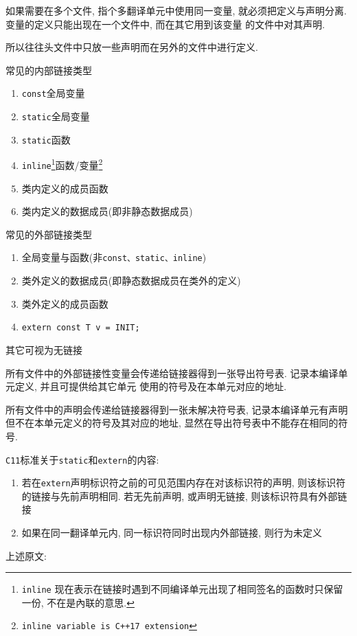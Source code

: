 如果需要在多个文件, 指个多翻译单元中使用同一变量, 就必须把定义与声明分离. 变量的定义只能出现在一个文件中, 而在其它用到该变量
	的文件中对其声明.

所以往往头文件中只放一些声明而在另外的文件中进行定义.

\begin{paracol}{2}
	\begin{leftcolumn}
		常见的内部链接类型
		\begin{enumerate}
			\item {\tt const}全局变量
			\item {\tt static}全局变量
			\item {\tt static}函数
			\item {\tt inline}\footnote[1]{{\tt inline} 现在表示在链接时遇到不同编译单元出现了相同签名的函数时只保留一份, 不在是內联的意思.}函数/变量\footnote[2]{{\tt inline variable is C++17 extension}}
			\item 类内定义的成员函数
			\item 类内定义的数据成员(即非静态数据成员)
		\end{enumerate}
	\end{leftcolumn}
	\begin{rightcolumn}
		常见的外部链接类型
		\begin{enumerate}
			\item 全局变量与函数(非{\tt const、static、inline})
			\item 类外定义的数据成员(即静态数据成员在类外的定义)
			\item 类外定义的成员函数
			\item {\tt extern const T v = INIT;}
		\end{enumerate}
	\end{rightcolumn}
\end{paracol}
其它可视为无链接

\vspace{1em}
所有文件中的外部链接性变量会传递给链接器得到一张导出符号表. 记录本编译单元定义, 并且可提供给其它单元
	使用的符号及在本单元对应的地址. 

所有文件中的声明会传递给链接器得到一张未解决符号表, 记录本编译单元有声明但不在本单元定义的符号及其对应的地址, 
	显然在导出符号表中不能存在相同的符号.

{\tt C11}标准关于{\tt static}和{\tt extern}的内容:
\begin{enumerate}
	\item 若在{\tt extern}声明标识符之前的可见范围内存在对该标识符的声明, 则该标识符的链接与先前声明相同. 
			若无先前声明, 或声明无链接, 则该标识符具有外部链接
	\item 如果在同一翻译单元内, 同一标识符同时出现内外部链接, 则行为未定义
\end{enumerate}
上述原文:

